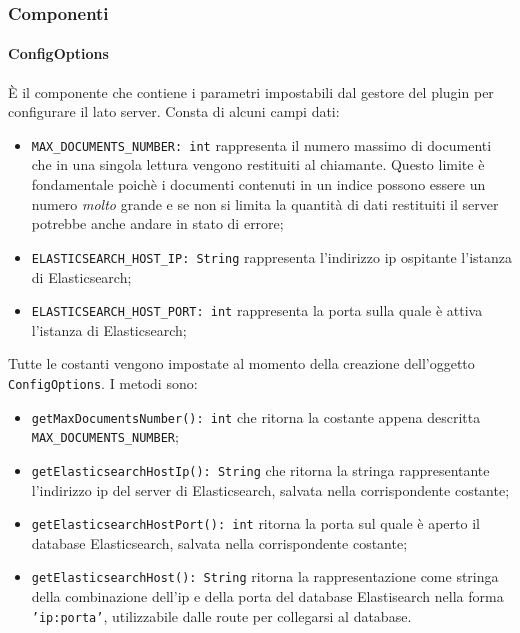 \subsubsection{Componenti}

\paragraph{ConfigOptions} \Spazio
È il componente che  contiene i parametri impostabili dal gestore del plugin per configurare il lato server. Consta di alcuni campi dati:

\begin{itemize}
	\item \texttt{MAX\_DOCUMENTS\_NUMBER: int} rappresenta il numero massimo di documenti che in una singola lettura vengono restituiti al chiamante. Questo limite è fondamentale poichè i documenti contenuti in un indice possono essere un numero \emph{molto} grande e se non si limita la quantità di dati restituiti il server potrebbe anche andare in stato di errore;
	
	\item \texttt{ELASTICSEARCH\_HOST\_IP: String} rappresenta l'indirizzo ip ospitante l'istanza di Elasticsearch;

	\item \texttt{ELASTICSEARCH\_HOST\_PORT: int} rappresenta la porta sulla quale è attiva l'istanza di Elasticsearch;
\end{itemize} 
Tutte le costanti vengono impostate al momento della creazione dell'oggetto \texttt{ConfigOptions}. I metodi sono: 
\begin{itemize}
	\item \texttt{getMaxDocumentsNumber(): int} che ritorna la costante appena descritta\\ \texttt{MAX\_DOCUMENTS\_NUMBER};
	\item \texttt{getElasticsearchHostIp(): String} che ritorna la stringa rappresentante l'indirizzo ip del server di Elasticsearch, salvata nella corrispondente costante;
	\item \texttt{getElasticsearchHostPort(): int} ritorna la porta sul quale è aperto il database Elasticsearch, salvata nella corrispondente costante; 
	\item \texttt{getElasticsearchHost(): String} ritorna la rappresentazione come stringa della combinazione dell'ip e della porta del database Elastisearch nella forma \texttt{'ip:porta'}, utilizzabile dalle route per collegarsi al database.
\end{itemize}

